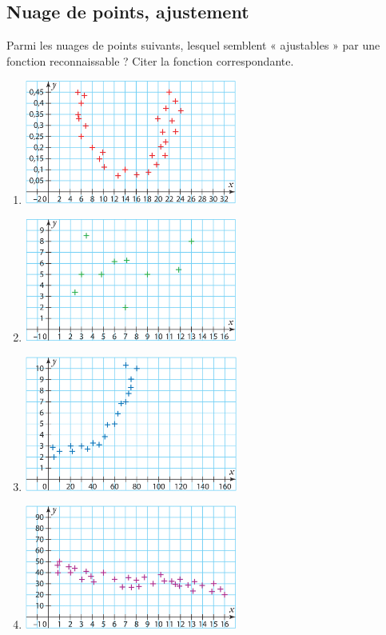 \documentclass[a4paper,11pt,exos]{nsi} %
\begin{document}
\maketitle


\subsection*{Nuage de points, ajustement}
\exo{}
Parmi les nuages de points suivants, lesquel semblent « ajustables » par une fonction reconnaissable ? Citer la fonction correspondante.
\begin{multicols}{2}
    \begin{enumerate}
        \item \includegraphics[width=7cm]{Ex18aSesamath.png}
        \item \includegraphics[width=7cm]{Ex18bSesamath.png}
        \item \includegraphics[width=7cm]{Ex18cSesamath.png}
        \item \includegraphics[width=7cm]{Ex18dSesamath.png}
    \end{enumerate}
\end{multicols}
\end{document}
